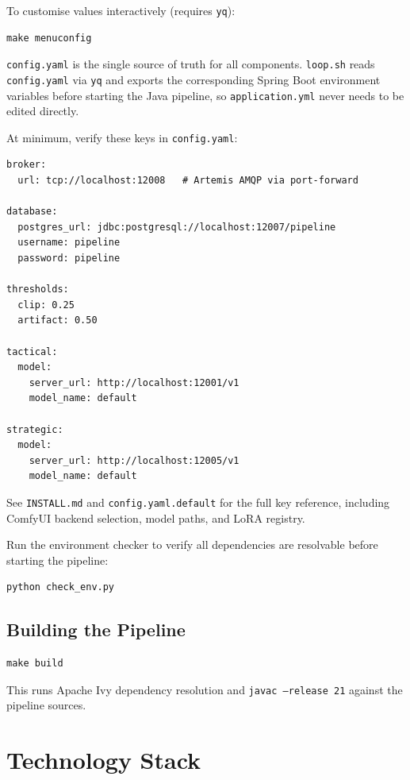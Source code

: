 \documentclass[11pt,letterpaper]{article}
\begin{document}
To customise values interactively (requires \texttt{yq}):

\begin{lstlisting}[style=shell]
make menuconfig
\end{lstlisting}

\texttt{config.yaml} is the single source of truth for all components.
\texttt{loop.sh} reads \texttt{config.yaml} via \texttt{yq} and exports the
corresponding Spring Boot environment variables before starting the Java pipeline,
so \texttt{application.yml} never needs to be edited directly.

At minimum, verify these keys in \texttt{config.yaml}:

\begin{lstlisting}[style=yaml]
broker:
  url: tcp://localhost:12008   # Artemis AMQP via port-forward

database:
  postgres_url: jdbc:postgresql://localhost:12007/pipeline
  username: pipeline
  password: pipeline

thresholds:
  clip: 0.25
  artifact: 0.50

tactical:
  model:
    server_url: http://localhost:12001/v1
    model_name: default

strategic:
  model:
    server_url: http://localhost:12005/v1
    model_name: default
\end{lstlisting}

See \texttt{INSTALL.md} and \texttt{config.yaml.default} for the full key reference,
including ComfyUI backend selection, model paths, and LoRA registry.

Run the environment checker to verify all dependencies are resolvable before
starting the pipeline:

\begin{lstlisting}[style=shell]
python check_env.py
\end{lstlisting}

\subsection{Building the Pipeline}

\begin{lstlisting}[style=shell]
make build
\end{lstlisting}

This runs Apache Ivy dependency resolution and \texttt{javac --release 21}
against the pipeline sources.

\section{Technology Stack}
\end{document}
